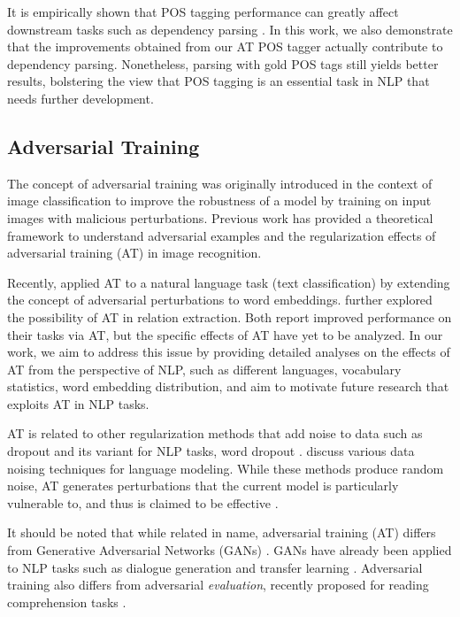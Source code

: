\documentclass[11pt,a4paper]{article}
\begin{document}
It is empirically shown that POS tagging performance can greatly affect downstream tasks such as dependency parsing \cite{dozat-qi-manning:2017:K17-3}. 
In this work, we also demonstrate that the improvements obtained from our AT POS tagger actually contribute to
dependency parsing. 
Nonetheless, parsing with gold POS tags still yields better results, bolstering the view that POS tagging is an essential task in NLP that needs further development.

\subsection{Adversarial Training}
The concept of adversarial training 
\cite{Szegedy2013,Goodfellow2015explain} was originally introduced in the context of image classification to improve the robustness of a model by training on input images with malicious perturbations.
Previous work
\cite{Goodfellow2015explain,shaham2015understanding,wang2016theoretical} has provided a theoretical framework to understand adversarial examples and the regularization effects of adversarial training (AT) in image recognition.

Recently,  applied AT to a natural language task (text classification)
by extending the concept of adversarial perturbations to word embeddings.
 further explored the possibility of AT in relation extraction.
Both report improved performance on their tasks via AT, but
the specific effects of AT have yet to be analyzed.
In our work, we aim to address this issue by providing detailed analyses on the effects of %
AT from the perspective of NLP, such as different languages, vocabulary statistics, word embedding distribution, and aim to motivate future research that exploits AT in NLP tasks.

AT is related to other  regularization methods that add noise to data
such as dropout \cite{JMLR:v15:srivastava14a} and its variant for NLP tasks, word dropout \cite{Iyyer:Manjunatha:Boyd-Graber:III-2015}.
 discuss various data noising techniques for language modeling.
While these methods produce random noise, AT generates perturbations that the current model is particularly vulnerable to, and thus is claimed to be effective \cite{Goodfellow2015explain}.

It should be noted that while related in name, adversarial training (AT)
differs from Generative Adversarial Networks (GANs) \cite{goodfellow2014generative}. GANs have already been applied to NLP tasks such as dialogue generation \cite{li2017adversarial} and transfer learning \cite{kim2017cross,gui2017part}. Adversarial training also differs from adversarial \textit{evaluation}, recently proposed for reading comprehension tasks \cite{jia2017adversarial}. 
\end{document}
